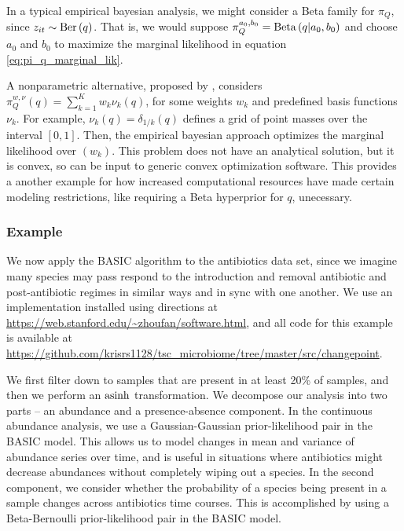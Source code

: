 \documentclass{article}
\begin{document}
In a typical empirical bayesian analysis, we might consider a Beta family for
$\pi_{Q}$, since $z_{it} \sim \textnormal{Ber}\left(q\right)$. That is, we would suppose
$\pi_{Q}^{a_0, b_0} = \textnormal{Beta}\left(q \vert a_{0}, b_{0}\right)$ and choose $a_{0}$
and $b_0$ to maximize the marginal likelihood in equation
\ref{eq:pi_q_marginal_lik}.

A nonparametric alternative, proposed by \citep{fan2015empirical}, considers
$\pi_{Q}^{w, \nu}\left(q\right) = \sum_{k = 1}^{K} w_{k} \nu_{k}\left(q\right)$,
for some weights $w_{k}$ and predefined basis functions $\nu_{k}$. For example,
$\nu_{k}\left(q\right) = \delta_{1 / k}\left(q\right)$ defines a grid of point
masses over the interval $\left[0, 1\right]$. Then, the empirical bayesian
approach optimizes the marginal likelihood over $\left(w_k\right)$. This problem
does not have an analytical solution, but it is convex, so can be input to
generic convex optimization software. This provides a another example for how
increased computational resources have made certain modeling restrictions, like
requiring a Beta hyperprior for $q$, unecessary.


\subsubsection{Example}
\label{subsec:basic_example}

We now apply the BASIC algorithm to the antibiotics data set, since we imagine
many species may pass respond to the introduction and removal antibiotic and
post-antibiotic regimes in similar ways and in sync with one another. We use an
implementation installed using directions at
\url{https://web.stanford.edu/~zhoufan/software.html}, and all code for this
example is available at
\url{https://github.com/krisrs1128/tsc_microbiome/tree/master/src/changepoint}.

We first filter down to samples that are present in at least 20\% of samples,
and then we perform an $\mathop\mathrm{asinh}$ transformation. We decompose our analysis into
two parts -- an abundance and a presence-absence component. In the continuous
abundance analysis, we use a Gaussian-Gaussian prior-likelihood pair in the
BASIC model. This allows us to model changes in mean and variance of abundance
series over time, and is useful in situations where antibiotics might decrease
abundances without completely wiping out a species. In the second component, we
consider whether the probability of a species being present in a sample changes
across antibiotics time courses. This is accomplished by using a Beta-Bernoulli
prior-likelihood pair in the BASIC model.
\end{document}

